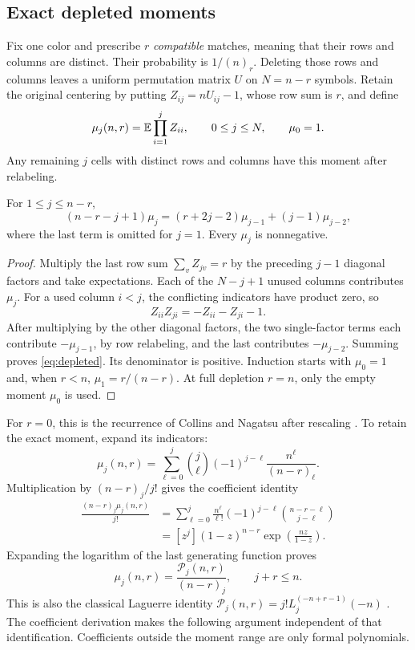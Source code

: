\subsection{Exact depleted moments}

Fix one color and prescribe $r$ \emph{compatible} matches, meaning that their rows and columns are distinct. Their probability is $1/(n)_r$. Deleting those rows and columns leaves a uniform permutation matrix $U$ on $N=n-r$ symbols. Retain the original centering by putting $Z_{ij}=nU_{ij}-1$, whose row sum is $r$, and define
\[
\mu_j(n,r)=\mathbb E\prod_{i=1}^j Z_{ii},\qquad 0\le j\le N,\qquad \mu_0=1.
\]
Any remaining $j$ cells with distinct rows and columns have this moment after relabeling.

\begin{lemma}\label{lem:depleted}
For $1\le j\le n-r$,
\begin{equation}\label{eq:depleted}
(n-r-j+1)\mu_j=(r+2j-2)\mu_{j-1}+(j-1)\mu_{j-2},
\end{equation}
where the last term is omitted for $j=1$. Every $\mu_j$ is nonnegative.
\end{lemma}
\begin{proof}
Multiply the last row sum $\sum_v Z_{jv}=r$ by the preceding $j-1$ diagonal factors and take expectations. Each of the $N-j+1$ unused columns contributes $\mu_j$. For a used column $i<j$, the conflicting indicators have product zero, so
\[
Z_{ii}Z_{ji}=-Z_{ii}-Z_{ji}-1.
\]
After multiplying by the other diagonal factors, the two single-factor terms each contribute $-\mu_{j-1}$, by row relabeling, and the last contributes $-\mu_{j-2}$. Summing proves \eqref{eq:depleted}. Its denominator is positive. Induction starts with $\mu_0=1$ and, when $r<n$, $\mu_1=r/(n-r)$. At full depletion $r=n$, only the empty moment $\mu_0$ is used.
\end{proof}

For $r=0$, this is the recurrence of Collins and Nagatsu after rescaling \cite[Proposition 3.3, equation (16)]{CN}. To retain the exact moment, expand its indicators:
\[
\mu_j(n,r)=\sum_{\ell=0}^j
\binom j\ell(-1)^{j-\ell}\frac{n^\ell}{(n-r)_\ell}.
\]
Multiplication by $(n-r)_j/j!$ gives the coefficient identity
\begin{align*}
\frac{(n-r)_j\mu_j(n,r)}{j!}
&=\sum_{\ell=0}^j\frac{n^\ell}{\ell!}
(-1)^{j-\ell}\binom{n-r-\ell}{j-\ell}\\
&=[z^j](1-z)^{n-r}\exp\left(\frac{nz}{1-z}\right).
\end{align*}
Expanding the logarithm of the last generating function proves
\begin{equation}\label{eq:poly-moment}
\mu_j(n,r)=\frac{\mathcal P_j(n,r)}{(n-r)_j},
\qquad j+r\le n.
\end{equation}
This is also the classical Laguerre identity
$\mathcal P_j(n,r)=j!L_j^{(-n+r-1)}(-n)$ \cite[equation 18.12.13]{DLMF}. The coefficient derivation makes the following argument independent of that identification. Coefficients outside the moment range are only formal polynomials.

